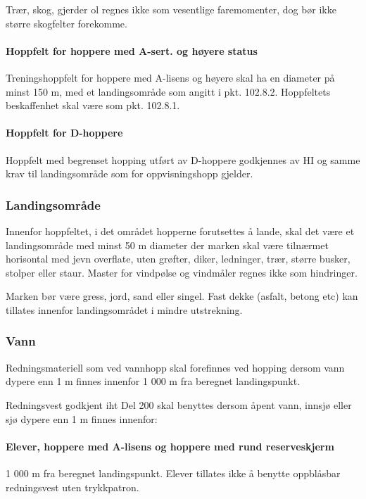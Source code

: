 Trær, skog, gjerder ol regnes ikke som vesentlige faremomenter, dog bør ikke større skogfelter forekomme.

\paragraph{Hoppfelt for hoppere med A-sert. og høyere status}
Treningshoppfelt for hoppere med A-lisens og høyere skal ha en diameter på minst 150 m, med et landingsområde som angitt i pkt. 102.8.2. Hoppfeltets beskaffenhet skal være som pkt. 102.8.1.

\paragraph{Hoppfelt for D-hoppere}
Hoppfelt med begrenset hopping utført av D-hoppere godkjennes av HI og samme krav til landingsområde som for oppvisningshopp gjelder.

\subsubsection{Landingsområde}
Innenfor hoppfeltet, i det området hopperne forutsettes å lande, skal det være et landingsområde med minst 50 m diameter der marken skal være tilnærmet horisontal med jevn overflate, uten grøfter, diker, ledninger, trær, større busker, stolper eller staur. Master for vindpølse og vindmåler regnes ikke som hindringer.

Marken bør være gress, jord, sand eller singel. Fast dekke (asfalt, betong etc) kan tillates innenfor landingsområdet i mindre utstrekning.

\subsubsection{Vann}
Redningsmateriell som ved vannhopp skal forefinnes ved hopping dersom vann dypere enn 1 m finnes innenfor 1 000 m fra beregnet landingspunkt.

Redningsvest godkjent iht Del 200 skal benyttes dersom åpent vann, innsjø eller sjø dypere enn 1 m finnes innenfor:

\paragraph{Elever, hoppere med A-lisens og hoppere med rund reserveskjerm}
1 000 m fra beregnet landingspunkt. Elever tillates ikke å benytte oppblåsbar redningsvest uten trykkpatron.

